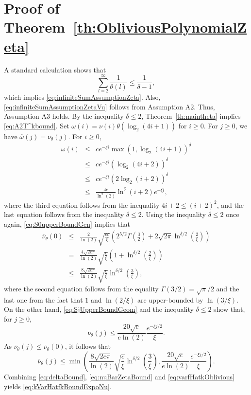 \documentclass[a4paper,11pt]{article}
\begin{document}
\section{Proof of Theorem~\ref{th:ObliviousPolynomialZeta} }
A standard calculation shows that \begin{displaymath}
\sum^{\infty}_{l=2}\frac{1}{\theta(l)}\leq\frac{1}{\delta-1},
\end{displaymath}
which implies  \eqref{eq:infiniteSumAssumptionZeta}. Also,   \eqref{eq:infiniteSumAssumptionZetaVu} follows from Assumption A2. Thus, Assumption A3 holds. By the inequality \(\delta\leq2\),
Theorem~\ref{th:maintheta} implies \eqref{eq:A2T^kbound}. Set \(\omega(i)=\nu(i)\theta(\log_{2}(4i+1))\) for \(i\geq0\).  For \(j\geq0\), we have \(\overline\omega(j)=\overline{\nu}_{\theta}(j)\). For \(i\geq0\),\begin{eqnarray*}\omega(i)&\leq&ce^{-\xi i}\max(1,\log_{2}(4i+1))^{\delta}\\
&\leq& ce^{-\xi i}(\log_{2}(4i+2))^{\delta}\\
&\leq& ce^{-\xi i}(2\log_{2}(i+2))^{\delta}\\
&\leq& \frac{4c}{\ln^{2}(2)} \ln^{\delta}(i+2)e^{-\xi i},
\end{eqnarray*} 
where the third equation follows from the inequality \(4i+2\leq(i+2)^{2}\), and the  last equation follows from the inequality \(\delta\leq2\). Using the inequality \(\delta\leq2\) once again,  \eqref{eq:S0upperBoundGen} implies that 
\begin{eqnarray*}
\overline{\nu}_{\theta}(0)
&\leq&\frac{2}{\ln(2)} \sqrt{\frac{ec}{\xi}}\left(2^{5/2}\Gamma\left(\frac{3}{2}\right)+2\sqrt{2\pi}\ln^{\delta/2}\left(\frac{2}{\xi}\right)\right)\\
&=&\frac{4\sqrt{2e\pi}}{\ln(2)} \sqrt{\frac{c}{\xi}}\left(1+\ln^{\delta/2}\left(\frac{2}{\xi}\right)\right)\\
&\le&\frac{8\sqrt{2e\pi}}{\ln(2)} \sqrt{\frac{c}{\xi}}\ln^{\delta/2}\left(\frac{3}{\xi}\right),
\end{eqnarray*}
where the second equation follows from the equality \(\Gamma(3/2)=\sqrt{\pi}/2\) and the last one from the fact that \(1\) and  \(\ln(2/\xi)\) are upper-bounded by  \(\ln(3/\xi)\). On the other hand,  \eqref{eq:SjUpperBoundGeom} and the inequality \(\delta\leq2\) show that, for \(j\geq 0\), \begin{displaymath}
\overline{\nu}_{\theta}(j)\leq {\frac{20\sqrt{c}}{e\ln(2)}}\frac{e^{-\xi j/2}}{\xi}.
\end{displaymath}
As \(\overline{\nu}_{\theta}(j)\le\overline{\nu}_{\theta}(0)\), it follows that
\begin{equation}\label{eq:nuBarZetaBound}
\overline{\nu}_{\theta}(j)\leq \min\left(\frac{8\sqrt{2e\pi}}{\ln(2)} \sqrt{\frac{c}{\xi}}\ln^{\delta/2}\left(\frac{3}{\xi}\right),{\frac{20\sqrt{c}}{e\ln(2)}}\frac{e^{-\xi j/2}}{\xi}\right).
\end{equation} 
Combining \eqref{eq:deltaBound}, \eqref{eq:nuBarZetaBound} and  \eqref{eq:varfHatkOblivious} yields \eqref{eq:kVarHatfkBoundExpoNu}. 
\end{document}
